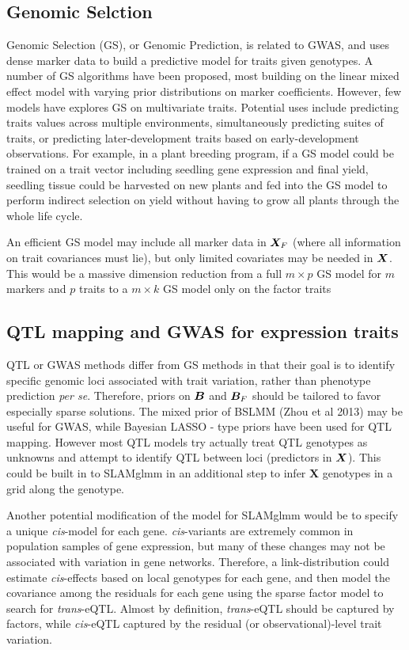 \documentclass[11pt]{amsart}
\newcommand*{\B}[1]{\ifmmode\bm{#1}\else\textbf{#1}\fi}
\begin{document}
\subsection{Genomic Selction}
Genomic Selection (GS), or Genomic Prediction, is related to GWAS, and uses dense marker data to build a predictive model for traits given genotypes. A number of GS algorithms have been proposed, most building on the linear mixed effect model with varying prior distributions on marker coefficients. However, few models have explores GS on multivariate traits. Potential uses include predicting traits values across multiple environments, simultaneously predicting suites of traits, or predicting later-development traits based on early-development observations. For example, in a plant breeding program, if a GS model could be trained on a trait vector including seedling gene expression and final yield, seedling tissue could be harvested on new plants and fed into the GS model to perform indirect selection on yield without having to grow all plants through the whole life cycle.

An efficient GS model may include all marker data in $\B{X}_F$ (where all information on trait covariances must lie), but only limited covariates may be needed in $\B{X}$. This would be a massive dimension reduction from a full $m \times p$ GS model for $m$ markers and $p$ traits to a $m \times k$ GS model only on the factor traits

\subsection{QTL mapping and GWAS for expression traits}
QTL or GWAS methods differ from GS methods in that their goal is to identify specific genomic loci associated with trait variation, rather than phenotype prediction \emph{per se}. Therefore, priors on $\B{B}$ and $\B{B}_F$ should be tailored to favor especially sparse solutions. The mixed prior of BSLMM (Zhou et al 2013) may be useful for GWAS, while Bayesian LASSO - type priors have been used for QTL mapping. However most QTL models try actually treat QTL genotypes as unknowns and attempt to identify QTL between loci (predictors in $\B{X}$). This could be built in to SLAMglmm in an additional step to infer \B{X} genotypes in a grid along the genotype.

Another potential modification of the model for SLAMglmm would be to specify a unique \emph{cis}-model for each gene. \emph{cis}-variants are extremely common in population samples of gene expression, but many of these changes may not be associated with variation in gene networks. Therefore, a link-distribution could estimate \emph{cis}-effects based on local genotypes for each gene, and then model the covariance among the residuals for each gene using the sparse factor model to search for \emph{trans}-eQTL. Almost by definition, \emph{trans}-eQTL should be captured by factors, while \emph{cis}-eQTL captured by the residual (or observational)-level trait variation.
\end{document}

